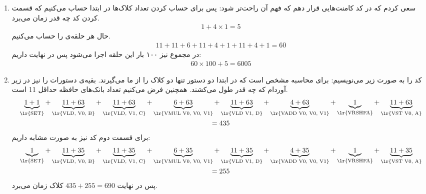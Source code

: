 \section{}
\begin{enumerate}
    \item سعی کردم که در کد کامنت‌هایی قرار دهم که فهم آن راحت‌تر شود:
    پس برای حساب کردن تعداد کلاک‌ها در ابتدا حساب می‌کنیم که قسمت
    کردن کد چه قدر زمان می‌برد.
    \begin{gather*}
        1 + 4 \times 1 = 5
    \end{gather*}
    حال هر حلقه‌ی
    را حساب می‌کنیم.
    \begin{gather*}
        11 + 11 + 6 + 11 + 4 + 1 + 11 + 4 + 1 = 60
    \end{gather*}
    در مجموع نیز ۱۰۰ بار این حلقه اجرا می‌شود پس در نهایت داریم:
    \begin{gather*}
        60 \times 100 + 5 = 6005
    \end{gather*}
    \item کد را به صورت زیر می‌نویسیم:
    برای محاسبه مشخص است که در ابتدا دو دستور  تنها دو کلاک را از ما می‌گیرند.
    بقیه‌ی دستورات را نیز در زیر آوردام که چه قدر طول می‌کشند.
    همچنین فرض می‌کنیم تعداد بانک‌های حافظه حداقل 11 است.
    \begin{gather*}
        \underbrace{1 + 1}_{\text{\lr{SET}}} + \underbrace{11 + 63}_{\text{\lr{VLD, V0, B}}} + \underbrace{11 + 63}_{\text{\lr{VLD, V1, C}}} + \underbrace{6 + 63}_{\text{\lr{VMUL V0, V0, V1}}} + \underbrace{11 + 63}_{\text{\lr{VLD V1, D}}} + \underbrace{4 + 63}_{\text{\lr{VADD V0, V0, V1}}} + \underbrace{1}_{\text{\lr{VRSHFA}}} + \underbrace{11 + 63}_{\text{\lr{VST V0, A}}} \\
        = 435
    \end{gather*}
    برای قسمت دوم کد نیز به صورت مشابه داریم:
    \begin{gather*}
        \underbrace{1}_{\text{\lr{SET}}} + \underbrace{11 + 35}_{\text{\lr{VLD, V0, B}}} + \underbrace{11 + 35}_{\text{\lr{VLD, V1, C}}} + \underbrace{6 + 35}_{\text{\lr{VMUL V0, V0, V1}}} + \underbrace{11 + 35}_{\text{\lr{VLD V1, D}}} + \underbrace{4 + 35}_{\text{\lr{VADD V0, V0, V1}}} + \underbrace{1}_{\text{\lr{VRSHFA}}} + \underbrace{11 + 35}_{\text{\lr{VST V0, A}}} \\
        = 255
    \end{gather*}
    پس در نهایت
    $435 + 255 = 690$
    کلاک زمان می‌برد.

\end{enumerate}
